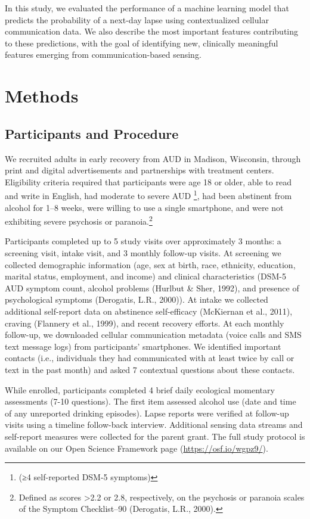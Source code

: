 \documentclass[
  letterpaper,
  DIV=11,
  numbers=noendperiod]{scrartcl}
\begin{document}
In this study, we evaluated the performance of a machine learning model
that predicts the probability of a next-day lapse using contextualized
cellular communication data. We also describe the most important
features contributing to these predictions, with the goal of identifying
new, clinically meaningful features emerging from communication-based
sensing.

\section{Methods}\label{methods}

\subsection{Participants and
Procedure}\label{participants-and-procedure}

We recruited adults in early recovery from AUD in Madison, Wisconsin,
through print and digital advertisements and partnerships with treatment
centers. Eligibility criteria required that participants were age 18 or
older, able to read and write in English, had moderate to severe AUD
\footnote{(≥4 self-reported DSM-5 symptoms)}, had been abstinent from
alcohol for 1--8 weeks, were willing to use a single smartphone, and
were not exhibiting severe psychosis or paranoia.\footnote{Defined as
  scores \textgreater2.2 or 2.8, respectively, on the psychosis or
  paranoia scales of the Symptom Checklist--90 (Derogatis, L.R., 2000).}

Participants completed up to 5 study visits over approximately 3 months:
a screening visit, intake visit, and 3 monthly follow-up visits. At
screening we collected demographic information (age, sex at birth, race,
ethnicity, education, marital status, employment, and income) and
clinical characteristics (DSM-5 AUD symptom count, alcohol problems
(Hurlbut \& Sher, 1992), and presence of psychological symptoms
(Derogatis, L.R., 2000)). At intake we collected additional self-report
data on abstinence self-efficacy (McKiernan et al., 2011), craving
(Flannery et al., 1999), and recent recovery efforts. At each monthly
follow-up, we downloaded cellular communication metadata (voice calls
and SMS text message logs) from participants' smartphones. We identified
important contacts (i.e., individuals they had communicated with at
least twice by call or text in the past month) and asked 7 contextual
questions about these contacts.

While enrolled, participants completed 4 brief daily ecological
momentary assessments (7-10 questions). The first item assessed alcohol
use (date and time of any unreported drinking episodes). Lapse reports
were verified at follow-up visits using a timeline follow-back
interview. Additional sensing data streams and self-report measures were
collected for the parent grant. The full study protocol is available on
our Open Science Framework page (\url{https://osf.io/wgpz9/}).
\end{document}
